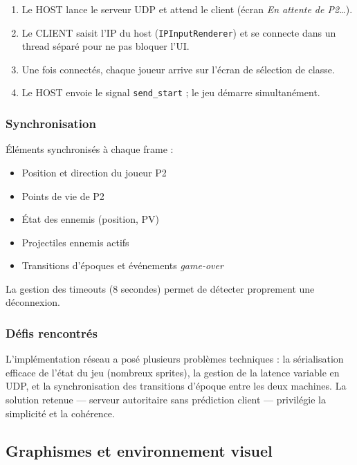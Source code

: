 \documentclass[12pt,a4paper]{article}
\begin{document}
\begin{enumerate}[noitemsep, leftmargin=1.8em]
  \item Le HOST lance le serveur UDP et attend le client (écran \textit{En attente de P2\ldots}).
  \item Le CLIENT saisit l'IP du host (\texttt{IPInputRenderer}) et se connecte dans un thread séparé pour ne pas bloquer l'UI.
  \item Une fois connectés, chaque joueur arrive sur l'écran de sélection de classe.
  \item Le HOST envoie le signal \texttt{send\_start} ; le jeu démarre simultanément.
\end{enumerate}

\subsubsection*{Synchronisation}

Éléments synchronisés à chaque frame :
\begin{itemize}[noitemsep, leftmargin=1.5em]
  \item Position et direction du joueur P2
  \item Points de vie de P2
  \item État des ennemis (position, PV)
  \item Projectiles ennemis actifs
  \item Transitions d'époques et événements \textit{game-over}
\end{itemize}

La gestion des timeouts (8 secondes) permet de détecter proprement une déconnexion.

\subsubsection*{Défis rencontrés}

L'implémentation réseau a posé plusieurs problèmes techniques : la sérialisation efficace de l'état du jeu (nombreux sprites), la gestion de la latence variable en UDP, et la synchronisation des transitions d'époque entre les deux machines. La solution retenue --- serveur autoritaire sans prédiction client --- privilégie la simplicité et la cohérence.

\subsection{Graphismes et environnement visuel}
\end{document}

